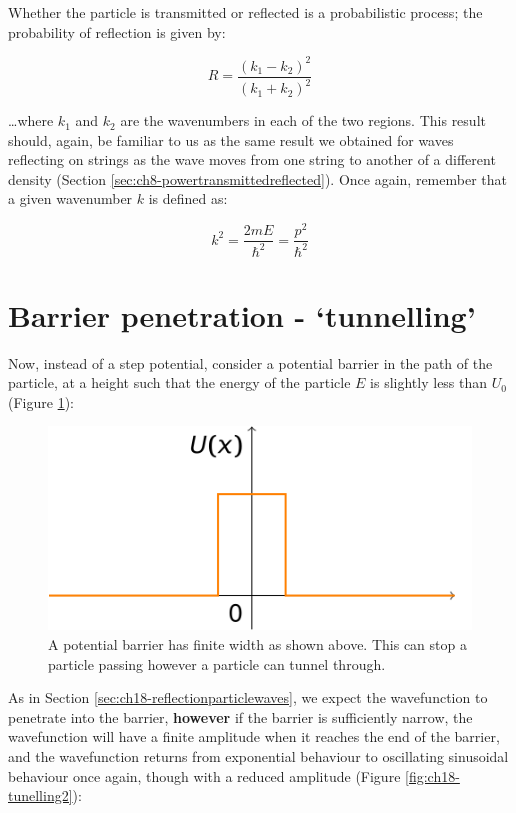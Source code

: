 \documentclass[
]{book}
\begin{document}
Whether the particle is transmitted or reflected is a probabilistic process; the probability of reflection is given by:

\begin{equation}
R = \frac{(k_1 - k_2)^2}{(k_1 + k_2)^2}
\end{equation}

\ldots where \(k_1\) and \(k_2\) are the wavenumbers in each of the two regions. This result should, again, be familiar to us as the same result we obtained for waves reflecting on strings as the wave moves from one string to another of a different density (Section \ref{sec:ch8-powertransmittedreflected}). Once again, remember that a given wavenumber \(k\) is defined as:

\begin{equation}
k^2 = \frac{2mE}{\hbar^2} = \frac{p^2}{\hbar^2}
\end{equation}

\hypertarget{sec:ch18-tunnelling1}{%
\section{Barrier penetration - `tunnelling'}\label{sec:ch18-tunnelling1}}

Now, instead of a step potential, consider a potential barrier in the path of the particle, at a height such that the energy of the particle \(E\) is slightly less than \(U_0\) (Figure \ref{fig:ch18-tunelling1}):

\begin{figure}

{\centering \includegraphics[width=0.7\linewidth]{visualisations/LaTeX/ch18-pestep3} 

}

\caption{A potential barrier has finite width as shown above. This can stop a particle passing however a particle can tunnel through.}\label{fig:ch18-tunelling1}
\end{figure}

As in Section \ref{sec:ch18-reflectionparticlewaves}, we expect the wavefunction to penetrate into the barrier, \textbf{however} if the barrier is sufficiently narrow, the wavefunction will have a finite amplitude when it reaches the end of the barrier, and the wavefunction returns from exponential behaviour to oscillating sinusoidal behaviour once again, though with a reduced amplitude (Figure \ref{fig:ch18-tunelling2}):
\end{document}
